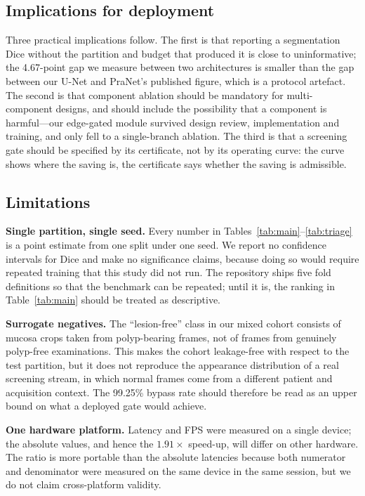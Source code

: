 \documentclass[journal]{IEEEtran}
\begin{document}
\subsection{Implications for deployment}

Three practical implications follow. The first is that reporting a segmentation Dice without the partition and budget that produced it is close to uninformative; the 4.67-point gap we measure between two architectures is smaller than the gap between our U-Net and PraNet's published figure, which is a protocol artefact. The second is that component ablation should be mandatory for multi-component designs, and should include the possibility that a component is harmful---our edge-gated module survived design review, implementation and training, and only fell to a single-branch ablation. The third is that a screening gate should be specified by its certificate, not by its operating curve: the curve shows where the saving is, the certificate says whether the saving is admissible.

\subsection{Limitations}

\textbf{Single partition, single seed.} Every number in Tables~\ref{tab:main}--\ref{tab:triage} is a point estimate from one split under one seed. We report no confidence intervals for Dice and make no significance claims, because doing so would require repeated training that this study did not run. The repository ships five fold definitions so that the benchmark can be repeated; until it is, the ranking in Table~\ref{tab:main} should be treated as descriptive.

\textbf{Surrogate negatives.} The ``lesion-free'' class in our mixed cohort consists of mucosa crops taken from polyp-bearing frames, not of frames from genuinely polyp-free examinations. This makes the cohort leakage-free with respect to the test partition, but it does not reproduce the appearance distribution of a real screening stream, in which normal frames come from a different patient and acquisition context. The 99.25\% bypass rate should therefore be read as an upper bound on what a deployed gate would achieve.

\textbf{One hardware platform.} Latency and FPS were measured on a single device; the absolute values, and hence the $1.91\times$ speed-up, will differ on other hardware. The ratio is more portable than the absolute latencies because both numerator and denominator were measured on the same device in the same session, but we do not claim cross-platform validity.
\end{document}
